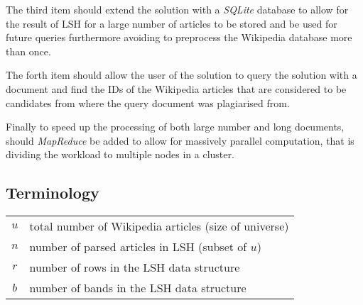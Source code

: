 The third item should extend the solution with a \emph{SQLite} database to allow for the result of LSH for a large number of articles to be stored and be used for future queries furthermore avoiding to preprocess the Wikipedia database more than once. 

The forth item should allow the user of the solution to query the solution with a document and find the IDs of the Wikipedia articles that are considered to be candidates from where the query document was plagiarised from.

Finally to speed up the processing of both large number and long documents, should \emph{MapReduce} be added to allow for massively parallel computation, that is dividing the workload to multiple nodes in a cluster.

\subsection{Terminology}
\begin{tabular}{cp{}}
  $u$ & total number of Wikipedia articles (size of universe) \\
  $n$ & number of parsed articles in LSH (subset of $u$) \\
  $r$ & number of rows in the LSH data structure \\
  $b$ & number of bands in the LSH data structure
\end{tabular}